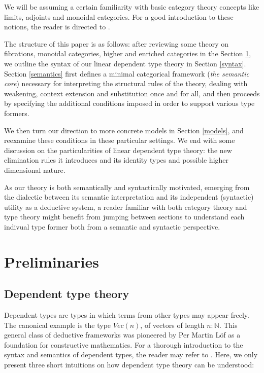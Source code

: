 We will be assuming a certain familiarity with basic category theory concepts like limits, adjoints and monoidal categories. For a good introduction to these notions, the reader is directed to \cite{awodey2010category}.

The structure of this paper is as follows: after reviewing some theory on fibrations, monoidal categories, higher and enriched categories in the Section \ref{prelim}, we outline the syntax of our linear dependent type theory in Section \ref{syntax}. Section \ref{semantics} first defines a minimal categorical framework (\textit{the semantic core}) necessary for interpreting the structural rules of the theory, dealing with weakening, context extension and substitution once and for all, and then proceeds by specifying the additional conditions imposed in order to support various type formers.

We then turn our direction to more concrete models in Section \ref{models}, and reexamine these conditions in these particular settings. We end with some discussion on the particularities of linear dependent type theory: the new elimination rules it introduces and its identity types and possible higher dimensional nature.

As our theory is both semantically and syntactically motivated, emerging from the dialectic between its semantic interpretation and its independent (syntactic) utility as a deductive system, a reader familiar with both category theory and type theory might benefit from jumping between sections to understand each indivual type former both from a semantic and syntactic perspective.
\section{Preliminaries}\label{prelim}
\subsection{Dependent type theory}
Dependent types are types in which terms from other types may appear freely. The canonical example is the type $Vec(n)$, of vectors of length $n : \mathbb{N}$. This general class of deductive frameworks was pioneered by Per Martin Löf \cite{martin1984intuitionistic} as a foundation for constructive mathematics. For a thorough introduction to the syntax and semantics of dependent types, the reader may refer to \cite{hofmann1997syntax}. Here, we only present three short intuitions on how dependent type theory can be understood:

